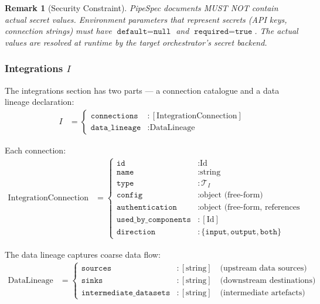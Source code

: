 \documentclass[11pt,a4paper]{article}
\newtheorem{remark}{Remark}[section]
\theoremstyle{definition}
\begin{document}
\begin{remark}[Security Constraint]
PipeSpec documents MUST NOT contain actual secret values. Environment parameters that represent secrets (API keys, connection strings) must have $\texttt{default} = \texttt{null}$ and $\texttt{required} = \texttt{true}$. The actual values are resolved at runtime by the target orchestrator's secret backend.
\end{remark}

\subsubsection{Integrations $I$}
The integrations section has two parts — a connection catalogue and a data lineage declaration:
\begin{align}
I &=
\begin{cases}
\texttt{connections}   &: [\text{IntegrationConnection}] \\
\texttt{data\_lineage} &: \text{DataLineage}
\end{cases}
\end{align}

Each connection:
\begin{align}
\text{IntegrationConnection} &=
\begin{cases}
\texttt{id}                 &: \text{Id} \\
\texttt{name}               &: \text{string} \\
\texttt{type}               &: \mathcal{T}_I \\
\texttt{config}             &: \text{object (free-form)} \\
\texttt{authentication}     &: \text{object (free-form, references secrets by name)} \\
\texttt{used\_by\_components}&: [\text{Id}] \\
\texttt{direction}          &: \{\texttt{input}, \texttt{output}, \texttt{both}\}
\end{cases}
\end{align}

The data lineage captures coarse data flow:
\begin{align}
\text{DataLineage} &=
\begin{cases}
\texttt{sources}               &: [\text{string}] \quad \text{(upstream data sources)} \\
\texttt{sinks}                 &: [\text{string}] \quad \text{(downstream destinations)} \\
\texttt{intermediate\_datasets}&: [\text{string}] \quad \text{(intermediate artefacts)}
\end{cases}
\end{align}
\end{document}
